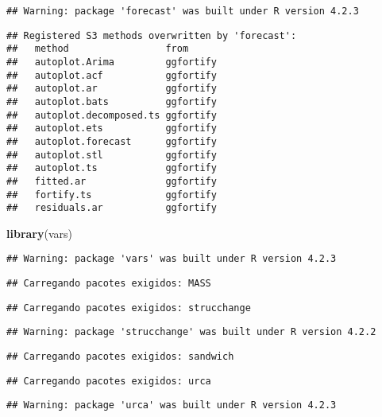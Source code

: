\documentclass[
]{article}
\newenvironment{Shaded}{\begin{snugshade}}{\end{snugshade}}
\newcommand{\FunctionTok}[1]{\textcolor[rgb]{0.13,0.29,0.53}{\textbf{#1}}}
\newcommand{\NormalTok}[1]{#1}
\begin{document}
\begin{verbatim}
## Warning: package 'forecast' was built under R version 4.2.3
\end{verbatim}

\begin{verbatim}
## Registered S3 methods overwritten by 'forecast':
##   method                 from     
##   autoplot.Arima         ggfortify
##   autoplot.acf           ggfortify
##   autoplot.ar            ggfortify
##   autoplot.bats          ggfortify
##   autoplot.decomposed.ts ggfortify
##   autoplot.ets           ggfortify
##   autoplot.forecast      ggfortify
##   autoplot.stl           ggfortify
##   autoplot.ts            ggfortify
##   fitted.ar              ggfortify
##   fortify.ts             ggfortify
##   residuals.ar           ggfortify
\end{verbatim}

\begin{Shaded}
\begin{Highlighting}[]
\FunctionTok{library}\NormalTok{(vars)}
\end{Highlighting}
\end{Shaded}

\begin{verbatim}
## Warning: package 'vars' was built under R version 4.2.3
\end{verbatim}

\begin{verbatim}
## Carregando pacotes exigidos: MASS
\end{verbatim}

\begin{verbatim}
## Carregando pacotes exigidos: strucchange
\end{verbatim}

\begin{verbatim}
## Warning: package 'strucchange' was built under R version 4.2.2
\end{verbatim}

\begin{verbatim}
## Carregando pacotes exigidos: sandwich
\end{verbatim}

\begin{verbatim}
## Carregando pacotes exigidos: urca
\end{verbatim}

\begin{verbatim}
## Warning: package 'urca' was built under R version 4.2.3
\end{verbatim}
\end{document}
